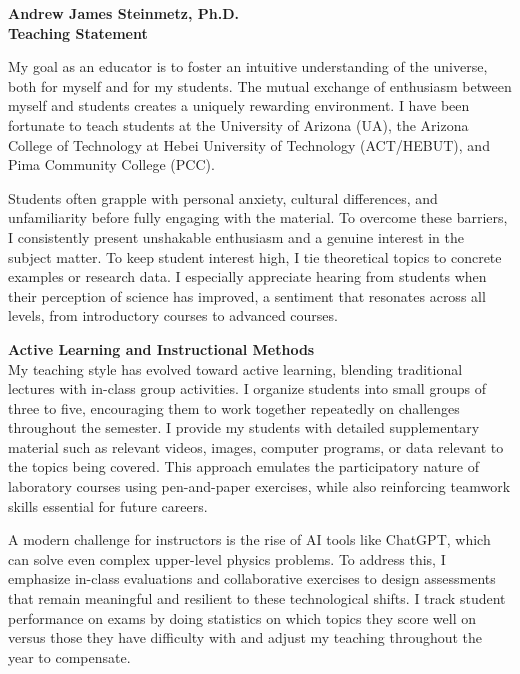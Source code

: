 \documentclass[11pt]{article}
\begin{document}
\begin{center}
    {\Large\textbf{Andrew James Steinmetz, Ph.D.}}\\[0.5em]
    {\large\textbf{Teaching Statement}}
\end{center}

\noindent
My goal as an educator is to foster an intuitive understanding of the universe, both for myself and for my students. The mutual exchange of enthusiasm between myself and students creates a uniquely rewarding environment. I have been fortunate to teach students at the University of Arizona (UA), the Arizona College of Technology at Hebei University of Technology (ACT/HEBUT), and Pima Community College (PCC).

Students often grapple with personal anxiety, cultural differences, and unfamiliarity before fully engaging with the material. To overcome these barriers, I consistently present unshakable enthusiasm and a genuine interest in the subject matter. To keep student interest high, I tie theoretical topics to concrete examples or research data. I especially appreciate hearing from students when their perception of science has improved, a sentiment that resonates across all levels, from introductory courses to advanced courses.

\vspace{1em}

{\noindent\Large\textbf{Active Learning and Instructional Methods}}\\
My teaching style has evolved toward active learning, blending traditional lectures with in-class group activities. I organize students into small groups of three to five, encouraging them to work together repeatedly on challenges throughout the semester. I provide my students with detailed supplementary material such as relevant videos, images, computer programs, or data relevant to the topics being covered. This approach emulates the participatory nature of laboratory courses using pen-and-paper exercises, while also reinforcing teamwork skills essential for future careers. 

A modern challenge for instructors is the rise of AI tools like ChatGPT, which can solve even complex upper-level physics problems. To address this, I emphasize in-class evaluations and collaborative exercises to design assessments that remain meaningful and resilient to these technological shifts. I track student performance on exams by doing statistics on which topics they score well on versus those they have difficulty with and adjust my teaching throughout the year to compensate.
\end{document}
